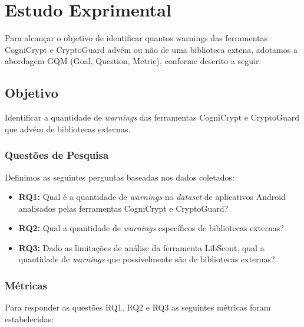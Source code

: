 \section{Estudo Exprimental}

Para alcançar o objetivo de identificar quantos warnings das ferramentas CogniCrypt e CryptoGuard advém ou não de uma biblioteca extena, adotamos a abordagem GQM (Goal, Question, Metric), conforme descrito a seguir:

\subsection{Objetivo}

Identificar a quantidade de \textit{warnings} das ferramentas CogniCrypt e CryptoGuard que advém de bibliotecas externas. 

\subsubsection{Questões de Pesquisa}
Definimos as seguintes perguntas baseadas nos dados coletados:

\begin{itemize}
\item \textbf{RQ1:} Qual é a quantidade de \textit{warnings} no \textit{dataset} de aplicativos Android analisados pelas ferramentas CogniCrypt e CryptoGuard?

\item \textbf{RQ2:} Qual a quantidade de \textit{warnings} específicos de bibliotecas externas?

\item \textbf{RQ3:} Dado as limitações de análise da ferramenta LibScout, qual a quantidade de \textit{warnings} que possivelmente são de bibliotecas externas?

\end{itemize}

\subsubsection{Métricas}
Para responder as questões RQ1, RQ2 e RQ3 as seguintes métricas foram estabelecidas:

